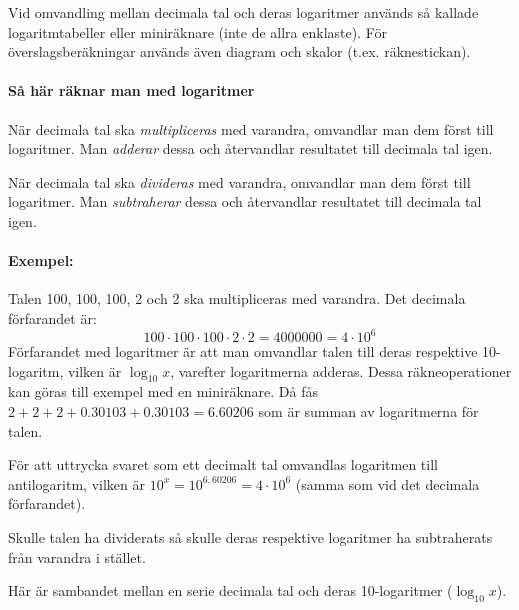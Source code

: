 Vid omvandling mellan decimala tal och deras logaritmer används så kallade
logaritmtabeller eller miniräknare (inte de allra enklaste).
För överslagsberäkningar används även diagram och skalor (t.ex. räknestickan).

\paragraph{Så här räknar man med logaritmer}

När decimala tal ska \emph{multipliceras} med varandra, omvandlar man dem
först till logaritmer.
Man \emph{adderar} dessa och återvandlar resultatet till decimala tal igen.

När decimala tal ska \emph{divideras} med varandra, omvandlar man dem först
till logaritmer.
Man \emph{subtraherar} dessa och återvandlar resultatet till decimala tal igen.

\paragraph{Exempel:}

Talen 100, 100, 100, 2 och 2 ska multipliceras med varandra.
Det decimala förfarandet är:
\[100 \cdot 100 \cdot 100 \cdot 2 \cdot 2 = 4000000 = 4 \cdot 10^6\]
Förfarandet med logaritmer är att man omvandlar talen till deras respektive
10-logaritm, vilken är \(\log_{10} x\), varefter logaritmerna adderas.
Dessa räkneoperationer kan göras till exempel med en miniräknare.
Då fås \(2 + 2 + 2 + 0.30103 + 0.30103 = 6.60206\) som är summan av
logaritmerna för talen.

För att uttrycka svaret som ett decimalt tal omvandlas logaritmen till
antilogaritm, vilken är \(10^x = 10^{6,60206} = 4 \cdot 10^6\) (samma som vid
det decimala förfarandet).

Skulle talen ha dividerats så skulle deras respektive logaritmer ha subtraherats
från varandra i stället.

Här är sambandet mellan en serie decimala tal och deras 10-logaritmer
(\(\log_{10} x\)).


